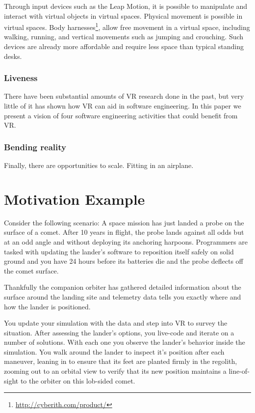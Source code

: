 \documentclass[conference]{IEEEtran}
\begin{document}
Through input devices such as the Leap Motion, it is possible to manipulate and interact with virtual objects in virtual spaces.
Physical movement is possible in virtual spaces.  Body harnesses\footnote{\url{http://cyberith.com/product/}}, allow free movement in a virtual space, including walking, running, and vertical movements such as jumping and crouching.  Such devices are already more affordable and require less space than typical standing desks.



\subsubsection{Liveness}

There have been substantial amounts of VR research done in the past, but very little of it has shown how VR can aid in software engineering. 
In this paper we present a vision of four software engineering activities that could benefit from VR.

\subsubsection{Bending reality}

Finally, there are opportunities to scale.
Fitting in an airplane.

\section{Motivation Example}

Consider the following scenario: A space mission has just landed a probe on the surface of a comet.
After 10 years in flight, the probe lands against all odds but at an odd angle and without deploying its anchoring harpoons. 
Programmers are tasked with updating the lander's software to reposition itself safely on solid ground and you have 24 hours before its batteries die and the probe deflects off the comet surface.

Thankfully the companion orbiter has gathered detailed information about the surface around the landing site and telemetry data tells you exactly where and how the lander is positioned. 

You update your simulation with the data and step into VR to survey the situation. 
After assessing the lander's options, you live-code and iterate on a number of solutions. 
With each one you observe the lander's behavior inside the simulation. 
You walk around the lander to inspect it's position after each maneuver, leaning in to ensure that its feet are planted firmly in the regolith, zooming out to an orbital view to verify that its new position maintains a line-of-sight to the orbiter on this lob-sided comet. 
\end{document}

